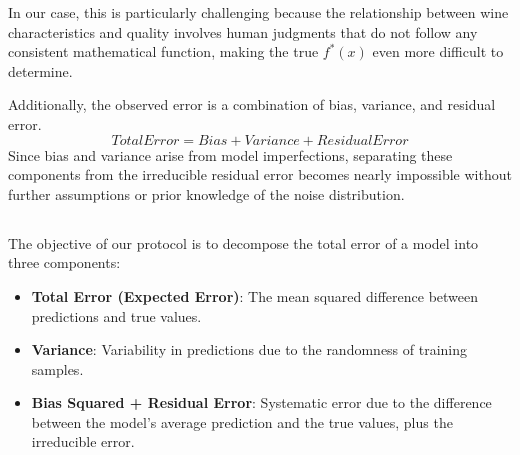 \documentclass[a4paper,10pt]{article}
\begin{document}
    In our case, this is particularly challenging because the relationship between wine characteristics and quality involves human judgments that do not follow any consistent mathematical function, making the true $f^*(x)$ even more difficult to determine. 
    
    Additionally, the observed error is a combination of bias, variance, and residual error. \[ Total Error = Bias + Variance + ResidualError\] Since bias and variance arise from model imperfections, separating these components from the irreducible residual error becomes nearly impossible without further assumptions or prior knowledge of the noise distribution.
    


\subsection{}

The objective of our protocol is to decompose the total error of a model into three components:
\begin{itemize}
    \item \textbf{Total Error (Expected Error)}: The mean squared difference between predictions and true values.
    \item \textbf{Variance}: Variability in predictions due to the randomness of training samples.
    \item \textbf{Bias Squared + Residual Error}: Systematic error due to the difference between the model's average prediction and the true values, plus the irreducible error.
\end{itemize}
\end{document}
